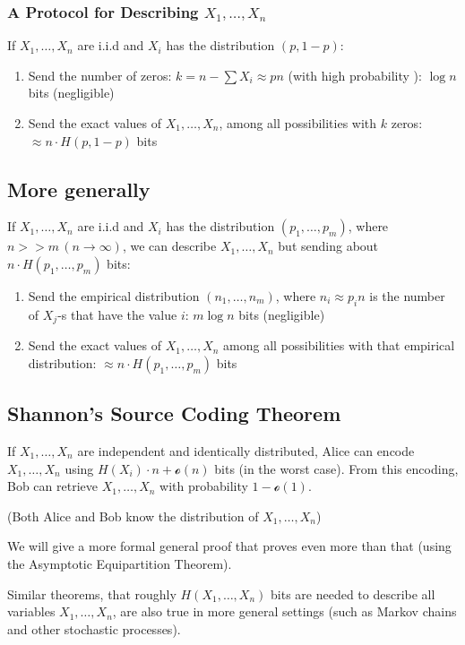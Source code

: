 \documentclass{article}
\begin{document}
\subsubsection{A Protocol for Describing $X_1,\ldots,X_n$}
If $X_1,\ldots,X_n$ are i.i.d and $X_i$ has the distribution $\left(p,1-p\right)$:
\begin{enumerate}
    \item Send the number of zeros: $k=n-\sum X_i\approx pn$ (with high probability ): $\log n$ bits (negligible)
    \item Send the exact values of $X_1,\ldots,X_n$, among all possibilities with $k$ zeros: $\approx n\cdot H(p,1-p)$ bits
\end{enumerate}

\subsection{More generally}

If $X_1,\ldots,X_n$ are i.i.d and $X_i$ has the distribution $\left(p_1,\ldots, p_m\right)$, where $n >> m \, \left(n\to \infty\right)$, we can describe $X_1,\ldots, X_n$ but sending about $n\cdot H(p_1,\ldots,p_m)$ bits:
\begin{enumerate}
    \item Send the empirical distribution $\left(n_1,\ldots, n_m\right)$, where $n_i\approx p_i n$ is the number of $X_j$-s that have the value $i$: $m\log n$ bits (negligible)
    \item Send the exact values of $X_1,\ldots, X_n$ among all possibilities with that empirical distribution: $\approx n\cdot H(p_1,\ldots,p_m)$ bits
\end{enumerate}

\subsection{Shannon's Source Coding Theorem}

If $X_1,\ldots,X_n$ are independent and identically distributed, Alice can encode $X_1,\ldots,X_n$ using $H(X_i)\cdot n + \mathcal{o }(n)$ bits (in the worst case). From this encoding, Bob can retrieve $X_1,\ldots, X_n$ with probability $1-\mathcal{o }(1)$.

(Both Alice and Bob know the distribution of $X_1,\ldots, X_n$)

We will give a more formal general proof that proves even more than that (using the Asymptotic Equipartition Theorem).

Similar theorems, that roughly $H(X_1,\ldots, X_n)$ bits are needed to describe all variables $X_1,\ldots, X_n$, are also true in more general settings (such as Markov chains and other stochastic processes).
\end{document}
